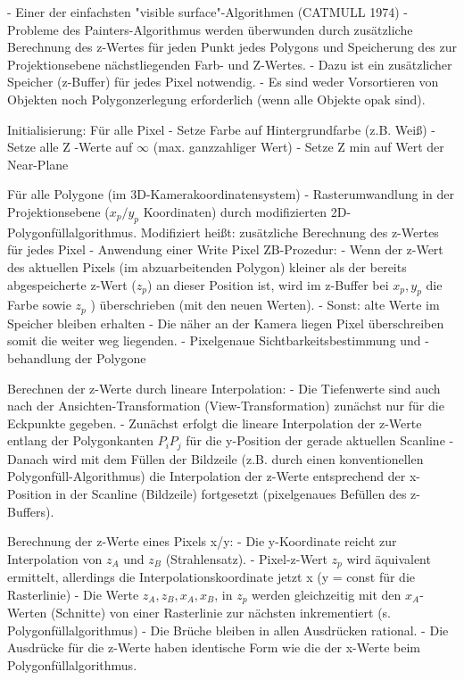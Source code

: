 \documentclass[10pt,landscape]{article}
\begin{document}
\begin{multicols}{3}
- Einer der einfachsten "visible surface"-Algorithmen (CATMULL 1974)
- Probleme des Painters-Algorithmus werden überwunden durch zusätzliche Berechnung des z-Wertes für jeden Punkt jedes Polygons und Speicherung des zur Projektionsebene nächstliegenden Farb- und Z-Wertes.
- Dazu ist ein zusätzlicher Speicher (z-Buffer) für jedes Pixel notwendig.
- Es sind weder Vorsortieren von Objekten noch Polygonzerlegung erforderlich (wenn alle Objekte opak sind).

Initialisierung: Für alle Pixel
- Setze Farbe auf Hintergrundfarbe (z.B. Weiß)
- Setze alle Z -Werte auf $\infty$ (max. ganzzahliger Wert)
- Setze Z min auf Wert der Near-Plane

Für alle Polygone (im 3D-Kamerakoordinatensystem)
- Rasterumwandlung in der Projektionsebene ($x_p/y_p$ Koordinaten) durch modifizierten 2D-Polygonfüllalgorithmus. Modifiziert heißt: zusätzliche Berechnung des z-Wertes für jedes Pixel
- Anwendung einer Write Pixel ZB-Prozedur:
  - Wenn der z-Wert des aktuellen Pixels (im abzuarbeitenden Polygon) kleiner als der bereits abgespeicherte z-Wert ($z_p$) an dieser Position ist, wird im z-Buffer bei $x_p , y_p$ die Farbe sowie $z_p$ ) überschrieben (mit den neuen Werten).
  - Sonst: alte Werte im Speicher bleiben erhalten
- Die näher an der Kamera liegen Pixel überschreiben somit die weiter weg liegenden.
- Pixelgenaue Sichtbarkeitsbestimmung und -behandlung der Polygone

Berechnen der z-Werte durch lineare Interpolation:
- Die Tiefenwerte sind auch nach der Ansichten-Transformation (View-Transformation) zunächst nur für die Eckpunkte gegeben.
- Zunächst erfolgt die lineare Interpolation der z-Werte entlang der Polygonkanten $P_i P_j$ für die y-Position der gerade aktuellen Scanline
- Danach wird mit dem Füllen der Bildzeile (z.B. durch einen konventionellen Polygonfüll-Algorithmus) die Interpolation der z-Werte entsprechend der x-Position in der Scanline (Bildzeile) fortgesetzt (pixelgenaues Befüllen des z-Buffers).

Berechnung der z-Werte eines Pixels x/y:
- Die y-Koordinate reicht zur Interpolation von $z_A$ und $z_B$ (Strahlensatz).
- Pixel-z-Wert $z_p$ wird äquivalent ermittelt, allerdings die Interpolationskoordinate jetzt x (y = const für die Rasterlinie)
- Die Werte $z_A, z_B, x_A, x_B$, in $z_p$ werden gleichzeitig mit den $x_A$-Werten (Schnitte) von einer Rasterlinie zur nächsten inkrementiert (s. Polygonfüllalgorithmus)
- Die Brüche bleiben in allen Ausdrücken rational. 
- Die Ausdrücke für die z-Werte haben identische Form wie die der x-Werte beim Polygonfüllalgorithmus.


\end{multicols}
\end{document}
